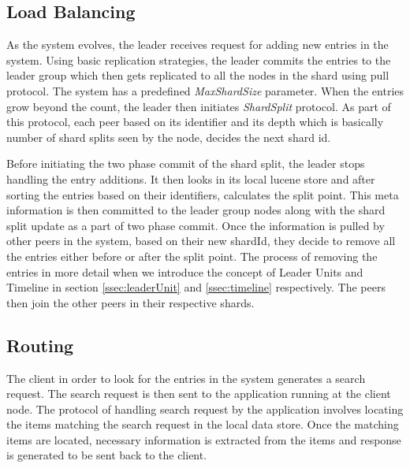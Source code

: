 \documentclass[a4paper,11pt]{kth-mag}
\begin{document}
\subsection{Load Balancing}
\label{ssec:loadBalance}
As the system evolves, the leader receives request for adding new entries in the system. Using basic replication strategies, the leader commits the entries to the leader group which then gets replicated to all the nodes in the shard using pull protocol. The system has a predefined \textit{MaxShardSize} parameter. When the entries grow beyond the count, the leader then initiates \textit{ShardSplit} protocol. As part of this protocol, each peer based on its identifier and its depth which is basically number of shard splits seen by the node, decides the next shard id.
\par Before initiating the two phase commit of the shard split, the leader stops handling the entry additions. It then looks in its local lucene store and after sorting the entries based on their identifiers, calculates the split point. This meta information is then committed to the leader group nodes along with the shard split update as a part of two phase commit. Once the information is pulled by other peers in the system, based on their new shardId, they decide to remove all the entries either before or after the split point. The process of removing the entries in more detail when we introduce the concept of Leader Units and Timeline in section \ref{ssec:leaderUnit} and \ref{ssec:timeline} respectively. The peers then join the other peers in their respective shards.



\subsection{Routing}
\label{ssec:routing}

\par The client in order to look for the entries in the system generates a search request. The search request is then sent to the application running at the client node. The protocol of handling search request by the application involves locating the items matching the search request in the local data store. Once the matching items are located, necessary information is extracted from the items and response is generated to be sent back to the client.
\end{document}
